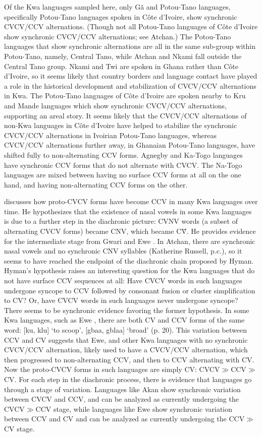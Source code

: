 \documentclass[output=paper,colorlinks,citecolor=brown]{langscibook}
\begin{document}
\sloppy
Of the Kwa languages sampled here, only Gã and Potou-Tano languages, specifically Potou-Tano languages spoken in Côte d'Ivoire, show synchronic CVCV\slash CCV alternations. (Though not all Potou-Tano languages of Côte d'Ivoire show synchronic CVCV\slash CCV alternations; see Atchan.) The Potou-Tano languages that show synchronic alternations are all in the same sub-group within Potou-Tano, namely, Central Tano, while Atchan and Nkami fall outside the Central Tano group. Nkami and Twi are spoken in Ghana rather than Côte d'Ivoire, so it seems likely that country borders and language contact have played a role in the historical development and stabilization of CVCV\slash CCV alternations in Kwa. The Potou-Tano languages of Côte d'Ivoire are spoken nearby to Kru and Mande languages which show synchronic CVCV\slash CCV alternations, supporting an areal story. It seems likely that the CVCV\slash CCV alternations of non-Kwa languages in Côte d'Ivoire have helped to stabilize the synchronic CVCV\slash CCV alternations in Ivoirian Potou-Tano languages, whereas CVCV\slash CCV alternations further away, in Ghanaian Potou-Tano languages, have shifted fully to non-alternating CCV forms. Agnegby and Ka-Togo languages have synchronic CCV forms that do not alternate with CVCV. The Na-Togo languages are mixed between having no surface CCV forms at all on the one hand, and having non-alternating CCV forms on the other.
\fussy

\citet[192]{Hyman:1972} discusses how proto-CVCV forms have become CCV in many Kwa languages over time. He hypothesizes that the existence of nasal vowels in some Kwa languages is due to a further step in the diachronic picture: CVNV words (a subset of alternating CVCV forms) became CNV, which became C{\~V}. He provides evidence for the intermediate stage from Gwari and Ewe \citep[175--179]{Hyman:1972}. In Atchan, there are synchronic nasal vowels and no synchronic CNV syllables (Katherine Russell, p.c.), so it seems to have reached the endpoint of the diachronic chain proposed by Hyman. Hyman's hypothesis raises an interesting question for the Kwa languages that do not have surface CCV sequences at all: Have CVCV words in such languages undergone syncope to CCV followed by consonant fusion or cluster simplification to CV? Or, have CVCV words in such languages never undergone syncope? There seems to be synchronic evidence favoring the former hypothesis. In some Kwa languages, such as Ewe \citep{Westermann:1930}, there are both CV and CCV forms of the same word: [ku, klu] `to scoop', [gbaa, gblaa] `broad' (p. 20). This variation between CCV and CV suggests that Ewe, and other Kwa languages with no synchronic CVCV\slash CCV alternation, likely used to have a CVCV\slash CCV alternation, which then progressed to non-alternating CCV, and then to CCV alternating with CV. Now the proto-CVCV forms in such languages are simply CV: CVCV$\gg$CCV$\gg$CV. For each step in the diachronic process, there is evidence that languages go through a stage of variation. Languages like Akan show synchronic variation between CVCV and CCV, and can be analyzed as currently undergoing the CVCV$\gg$CCV stage, while languages like Ewe show synchronic variation between CCV and CV and can be analyzed as currently undergoing the CCV$\gg$CV stage.
\end{document}
